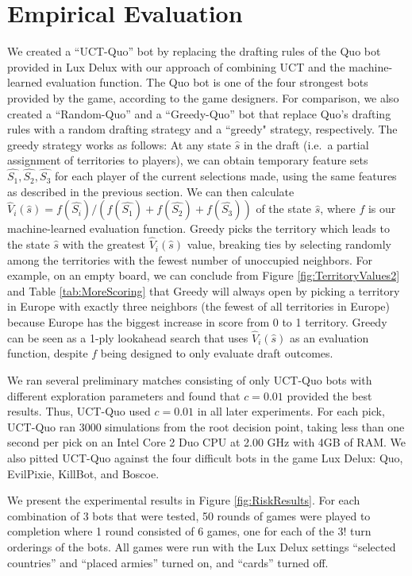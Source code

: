 \documentclass[letterpaper]{article}
\numberwithin{equation}{section}
\numberwithin{theorem}{section}
\numberwithin{lemma}{section}
\numberwithin{df}{section}
\begin{document}
\section{Empirical Evaluation}


We created a ``UCT-Quo'' bot by replacing the drafting rules of the Quo bot provided in Lux Delux with our approach of combining UCT and the machine-learned evaluation function.  The Quo bot is one of the four strongest bots provided by the game, according to the game designers.  For comparison, we also created a ``Random-Quo'' and a ``Greedy-Quo'' bot that replace Quo's drafting rules with a random drafting strategy and a ``greedy" strategy, respectively.  The greedy strategy works as follows: At any state $\hat{s}$ in the draft (i.e.~a partial assignment of territories to players), we can obtain temporary feature sets $\hat{S_1}, \hat{S_2}, \hat{S_3}$ for each player of the current selections made, using the same features as described in the previous section.  We can then calculate $\hat{V}_i(\hat{s}) = f(\hat{S_i}) / (f(\hat{S_1}) + f(\hat{S_2}) + f(\hat{S_3}))$ of the state $\hat{s}$, where $f$ is our machine-learned evaluation function.  Greedy picks the territory which leads to the state $\hat{s}$ with the greatest $\hat{V}_i(\hat{s})$ value, breaking ties by selecting randomly among the territories with the fewest number of unoccupied neighbors.  For example, on an empty board, we can conclude from Figure \ref{fig:TerritoryValues2} and Table \ref{tab:MoreScoring} that Greedy will always open by picking a territory in Europe with exactly three neighbors (the fewest of all territories in Europe) because Europe has the biggest increase in score from 0 to 1 territory.  
Greedy can be seen as a 1-ply lookahead search that uses $\hat{V}_i(\hat{s})$ as an evaluation function, despite $f$ being designed to only evaluate draft outcomes.  

We ran several preliminary matches consisting of only UCT-Quo bots with different exploration parameters and found that $c=0.01$ provided the best results.  Thus, UCT-Quo used $c=0.01$ in all later experiments.  For each pick, UCT-Quo ran $3000$ simulations from the root decision point, taking less than one second per pick on an Intel Core 2 Duo CPU at 2.00 GHz with 4GB of RAM.  We also pitted UCT-Quo against the four difficult bots in the game Lux Delux: Quo, EvilPixie, KillBot, and Boscoe.

We present the experimental results in Figure \ref{fig:RiskResults}.  For each combination of 3 bots that were tested, 50 rounds of games were played to completion where 1 round consisted of 6 games, one for each of the $3!$ turn orderings of the bots.  All games were run with the Lux Delux settings ``selected countries'' and ``placed armies'' turned on, and ``cards'' turned off.  
\end{document}
